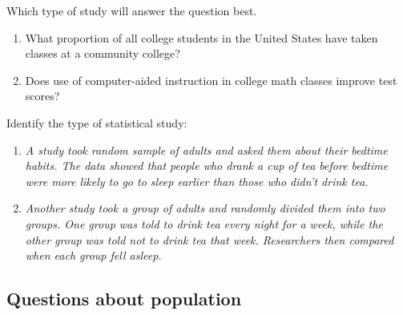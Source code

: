 \begin{example}
  Which type of study will answer the question best.

  \begin{enumerate}[itemsep=2\baselineskip]
  \item
    What proportion of all college students in the United States have
    taken classes at a community college?
  \item
    Does use of computer-aided instruction in college math classes
    improve test scores?
  \end{enumerate}
\end{example}

\begin{exercise}
  Identify the type of statistical study:
  \begin{enumerate}[itemsep=2\baselineskip]
  \item
    \emph{A study took random sample of adults and asked them about their
    bedtime habits. The data showed that people who drank a cup of tea
    before bedtime were more likely to go to sleep earlier than those who didn't drink tea.}
  \item
    \emph{Another study took a group of adults and randomly divided them into two groups. One group was told to drink tea every night for a week, while the other group was told not to drink tea that week.
    Researchers then compared when each group fell asleep.}
  \end{enumerate}
\end{exercise}
\vspace*{-2\baselineskip}

\hypertarget{questions-about-population-12}{%
\subsection{Questions about population}\label{questions-about-population-12}}

